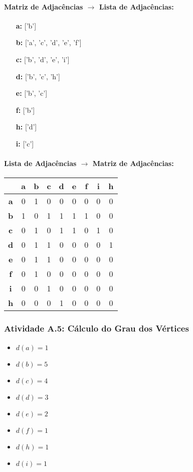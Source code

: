 \documentclass[a4paper,12pt]{article}
\begin{document}
\paragraph*{Matriz de Adjacências $\rightarrow$ Lista de Adjacências:}
\begin{itemize}[leftmargin=*]
    \item[\textbf{a:}] ['b'] \item[\textbf{b:}] ['a', 'c', 'd', 'e', 'f'] \item[\textbf{c:}] ['b', 'd', 'e', 'i']
    \item[\textbf{d:}] ['b', 'c', 'h'] \item[\textbf{e:}] ['b', 'c'] \item[\textbf{f:}] ['b']
    \item[\textbf{h:}] ['d'] \item[\textbf{i:}] ['c']
\end{itemize}
\paragraph*{Lista de Adjacências $\rightarrow$ Matriz de Adjacências:}
\begin{center}
\scriptsize
\begin{tabular*}{\textwidth}{c|@{\extracolsep{\fill}}cccccccc}
\rowcolor[gray]{0.9}
 & \textbf{a} & \textbf{b} & \textbf{c} & \textbf{d} & \textbf{e} & \textbf{f} & \textbf{i} & \textbf{h} \\ \hline
\textbf{a} & 0 & 1 & 0 & 0 & 0 & 0 & 0 & 0 \\ \textbf{b} & 1 & 0 & 1 & 1 & 1 & 1 & 0 & 0 \\
\textbf{c} & 0 & 1 & 0 & 1 & 1 & 0 & 1 & 0 \\ \textbf{d} & 0 & 1 & 1 & 0 & 0 & 0 & 0 & 1 \\
\textbf{e} & 0 & 1 & 1 & 0 & 0 & 0 & 0 & 0 \\ \textbf{f} & 0 & 1 & 0 & 0 & 0 & 0 & 0 & 0 \\
\textbf{i} & 0 & 0 & 1 & 0 & 0 & 0 & 0 & 0 \\ \textbf{h} & 0 & 0 & 0 & 1 & 0 & 0 & 0 & 0 \\
\end{tabular*}
\end{center}

\subsubsection*{Atividade A.5: Cálculo do Grau dos Vértices}
\begin{multicols}{3}
\begin{itemize}[nosep]
    \item $d(a) = 1$ \item $d(b) = 5$ \item $d(c) = 4$
    \item $d(d) = 3$ \item $d(e) = 2$ \item $d(f) = 1$
    \item $d(h) = 1$ \item $d(i) = 1$
\end{itemize}
\end{multicols}
\end{document}
